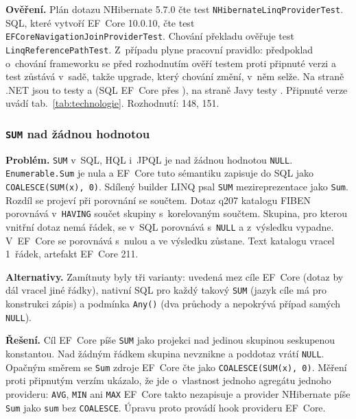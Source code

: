 \textbf{Ověření.} Plán dotazu NHibernate 5.7.0 čte test \texttt{NHibernateLinqProviderTest}. SQL, které vytvoří EF~Core 10.0.10, čte test \texttt{EFCoreNavigationJoinProviderTest}. Chování překladu ověřuje test \texttt{LinqReferencePathTest}. Z~případu plyne pracovní pravidlo: předpoklad o~chování frameworku se před rozhodnutím ověří testem proti připnuté verzi a test zůstává v~sadě, takže upgrade, který chování změní, v~něm selže. Na straně .NET jsou to testy  a  (SQL EF~Core přes ), na straně Javy testy . Připnuté verze uvádí tab.~\ref{tab:technologie}. Rozhodnutí: 148, 151.

\subsubsection*{\texttt{SUM} nad žádnou hodnotou}

\textbf{Problém.} \texttt{SUM} v~SQL, HQL i~JPQL je nad žádnou hodnotou \texttt{NULL}. \texttt{Enumerable.Sum} je nula a EF~Core tuto sémantiku zapisuje do SQL jako \texttt{COALESCE(SUM(x), 0)}. Sdílený builder LINQ psal \texttt{SUM} mezireprezentace jako \texttt{Sum}. Rozdíl se projeví při porovnání se součtem. Dotaz q207 katalogu FIBEN porovnává v~\texttt{HAVING} součet skupiny s~korelovaným součtem. Skupina, pro kterou vnitřní dotaz nemá řádek, se v~SQL porovnává s~\texttt{NULL} a z~výsledku vypadne. V~EF~Core se porovnává s~nulou a ve výsledku zůstane. Text katalogu vracel 1~řádek, artefakt EF~Core 211.

\textbf{Alternativy.} Zamítnuty byly tři varianty: uvedená mez cíle EF~Core (dotaz by dál vracel jiné řádky), nativní SQL pro každý takový \texttt{SUM} (jazyk cíle má pro konstrukci zápis) a podmínka \texttt{Any()} (dva průchody a nepokrývá případ samých \texttt{NULL}).

\textbf{Řešení.} Cíl EF~Core píše \texttt{SUM} jako projekci nad jedinou skupinou seskupenou konstantou. Nad žádným řádkem skupina nevznikne a poddotaz vrátí \texttt{NULL}. Opačným směrem se \texttt{Sum} zdroje EF~Core čte jako \texttt{COALESCE(SUM(x), 0)}. Měření proti připnutým verzím ukázalo, že jde o~vlastnost jednoho agregátu jednoho provideru: \texttt{AVG}, \texttt{MIN} ani \texttt{MAX} EF~Core takto nezapisuje a provider NHibernate píše \texttt{Sum} jako \texttt{sum} bez \texttt{COALESCE}. Úpravu proto provádí hook provideru EF~Core.

